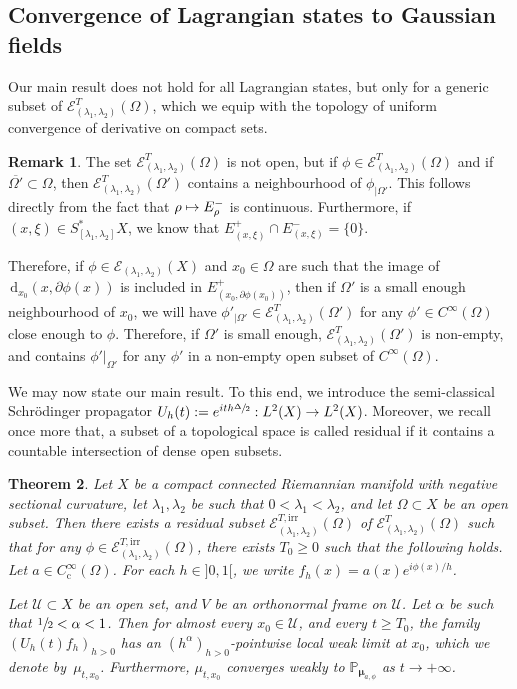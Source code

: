 \documentclass[JEP,XML,SOM,Unicode,published]{cedram}
\let\mathcal\mathscr
\newcommand\mto{\mathchoice{\longmapsto}{\mapsto}{\mapsto}{\mapsto}}
\newcommand{\rc}{\mathrm{c}}
\newcommand{\rd}{\,\mathrm{d}}
\newcommand{\irr}{\mathrm{irr}}
\theoremstyle{plain}
\newtheorem{theorem}{Theorem}[section]
\theoremstyle{definition}
\newtheorem{remark}[theorem]{Remark}
\begin{document}
\subsection{Convergence of Lagrangian states to Gaussian fields}
Our main result does not hold for all Lagrangian states, but only for a generic subset of $\mathcal{E}^{T}_{(\lambda_1,\lambda_2)}(\Omega)$, which we equip with the topology of uniform convergence of derivative on compact sets.

\begin{remark}\label{rem:NonEmpty}
The set $\mathcal{E}^T_{(\lambda_1,\lambda_2)}(\Omega)$ is not open, but if $\phi \in \mathcal{E}_{(\lambda_1,\lambda_2)}^T(\Omega)$ and if $\overline{\Omega'} \subset \Omega$, then $ \mathcal{E}_{(\lambda_1,\lambda_2)}^T(\Omega')$ contains a neighbourhood of $\phi_{|\Omega'}$. This follows directly from the fact that $\rho\mto E_\rho^-$ is continuous. Furthermore, if $(x,\xi)\in S_{[\lambda_1,\lambda_2]}^*X$, we know that $E_{(x,\xi)}^+\cap E_{(x,\xi)}^-= \{0\}$.

Therefore, if $\phi \in \mathcal{E}_{(\lambda_1,\lambda_2)}(X)$ and $x_0\in \Omega$ are such that the image of $\rd _{x_0} (x, \partial \phi(x))$ is included in $E_{(x_0, \partial \phi(x_0))}^+$, then if $\Omega'$ is a small enough neighbourhood of $x_0$, we will have $\phi'_{|\Omega'} \in \mathcal{E}^T_{(\lambda_1,\lambda_2)}(\Omega')$ for any $\phi'\in C^\infty(\Omega)$ close enough to $\phi$. Therefore, if $\Omega'$ is small enough, $\mathcal{E}^T_{(\lambda_1,\lambda_2)}(\Omega')$ is non-empty, and contains $\phi'|_{\Omega'}$ for any $\phi'$ in a non-empty open subset of $C^\infty(\Omega)$.
\end{remark}

We may now state our main result. To this end, we introduce the semi-classical Schrödinger propagator $U_h(t):=e^{ith\sfrac{\Delta}{2}}:L^2(X)\to L^2(X)$. Moreover, we recall once more that, a subset of a topological space is called residual if it contains a countable intersection of dense open subsets.

\begin{theorem}\label{th:Pointwise}
Let $X$ be a compact connected Riemannian manifold with negative sectional curvature, let $\lambda_1,\lambda_2$ be such that $0<\lambda_1<\lambda_2$, and let $\Omega\subset X$ be an open subset. Then there exists a residual subset $\mathcal{E}^{T,\irr}_{(\lambda_1,\lambda_2)}(\Omega)$ of $\mathcal{E}^T_{(\lambda_1,\lambda_2)}(\Omega)$ such that for any $\phi\in \mathcal{E}^{T,\irr}_{(\lambda_1,\lambda_2)}(\Omega)$, there exists $T_0\geq 0$ such that the following holds. Let $a\in C_\rc^\infty(\Omega)$. For each $h\in{}]0,1[$, we write $f_h(x)=a(x)e^{i\phi(x)/h}$.

Let $\mathcal{U}\subset X$ be an open set, and $V$ be an orthonormal frame on $\mathcal{U}$. Let $\alpha$ be such that $\sfrac{1}{2}<\alpha<1$. Then for almost every $x_0\in \mathcal{U}$, and every $t\geq T_0$, the family $(U_h(t) f_h)_{h>0}$ has an $(h^\alpha)_{h>0}$-pointwise local weak limit at $x_0$, which we denote by~$\mu_{t,x_0}$. Furthermore, $\mu_{t,x_0}$ converges weakly to $\mathbb{P}_{\boldsymbol{\mu}_{a, \phi}}$ as $t\to +\infty$.
\end{theorem}
\end{document}
